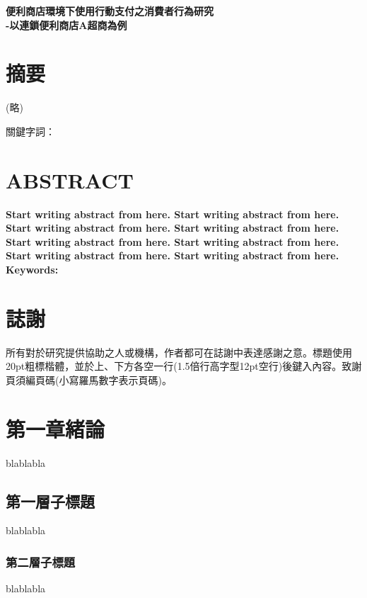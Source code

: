 \documentclass[12pt]{ncut}
\begin{document}
\begin{center} %
    \Large
    \textbf{便利商店環境下使用行動支付之消費者行為研究\\
    -以連鎖便利商店A超商為例}
\end{center}

\section{摘要}
\begin{center}
    (略)
\end{center}
\noindent 關鍵字詞：

\newpage

\section{ABSTRACT}

\textbf{Start writing abstract from here. Start writing abstract from here. Start writing abstract from here. Start writing abstract from here. Start writing abstract from here. Start writing abstract from here. Start writing abstract from here. Start writing abstract from here.\\
Keywords:}

\newpage

\section{誌謝}

\indent
所有對於研究提供協助之人或機構，作者都可在誌謝中表達感謝之意。標題使用 20pt粗標楷體，並於上、下方各空一行(1.5倍行高字型12pt空行)後鍵入內容。致謝頁須編頁碼(小寫羅馬數字表示頁碼)。

\newpage

\tableofcontents
\newpage

\listoftables
\newpage

\listoffigures
\newpage


\setcounter{section}{0} %
\section{第一章緒論}
blablabla

\subsection{第一層子標題}
blablabla

\subsubsection{第二層子標題}
blablabla
\end{document}
